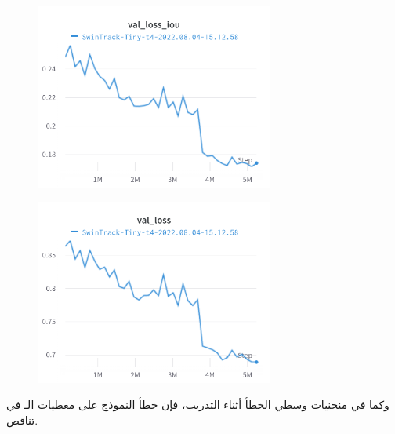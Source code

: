 \begin{figure}[H]
	\centerline{\includegraphics[width=0.7\textwidth]{charts/Section-2-Panel-2-owiohngs7}}
	\caption{
	}
\end{figure}

\begin{figure}[H]
	\centerline{\includegraphics[width=0.7\textwidth]{charts/Section-2-Panel-0-jvrhhrv9d}}
	\caption{
	}
\end{figure}

وكما في منحنيات وسطي الخطأ أثناء التدريب، فإن خطأ النموذج على معطيات الـ
في تناقص.
